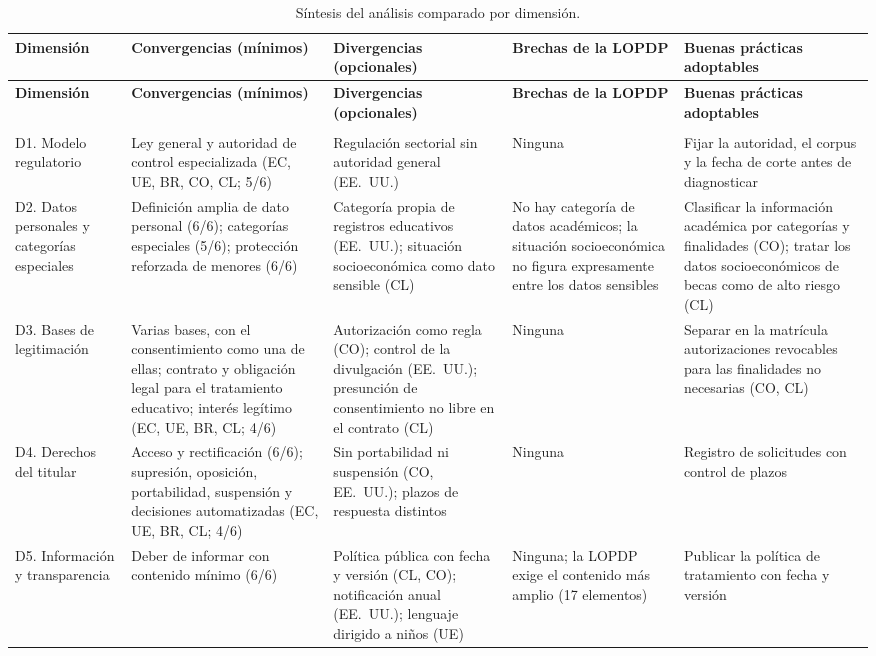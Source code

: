 {\scriptsize
\renewcommand{\arraystretch}{1.15}
\begin{xltabular}{\textwidth}{|>{\raggedright\arraybackslash}p{2.6cm}|L|L|L|L|}
  \caption{Síntesis del análisis comparado por dimensión.}
  \label{tab:sintesis_dimensiones} \\
  \hline
  \textbf{Dimensión} & \textbf{Convergencias (mínimos)} & \textbf{Divergencias (opcionales)} & \textbf{Brechas de la LOPDP} & \textbf{Buenas prácticas adoptables} \\
  \hline
  \endfirsthead
  \hline
  \textbf{Dimensión} & \textbf{Convergencias (mínimos)} & \textbf{Divergencias (opcionales)} & \textbf{Brechas de la LOPDP} & \textbf{Buenas prácticas adoptables} \\
  \hline
  \endhead
  \hline
   \\
  \endfoot
  \hline
  \endlastfoot
  D1. Modelo regulatorio & Ley general y autoridad de control especializada (EC, UE, BR, CO, CL; 5/6) & Regulación sectorial sin autoridad general (EE.~UU.) & Ninguna & Fijar la autoridad, el corpus y la fecha de corte antes de diagnosticar \\ \hline
  D2. Datos personales y categorías especiales & Definición amplia de dato personal (6/6); categorías especiales (5/6); protección reforzada de menores (6/6) & Categoría propia de registros educativos (EE.~UU.); situación socioeconómica como dato sensible (CL) & No hay categoría de datos académicos; la situación socioeconómica no figura expresamente entre los datos sensibles & Clasificar la información académica por categorías y finalidades (CO); tratar los datos socioeconómicos de becas como de alto riesgo (CL) \\ \hline
  D3. Bases de legitimación & Varias bases, con el consentimiento como una de ellas; contrato y obligación legal para el tratamiento educativo; interés legítimo (EC, UE, BR, CL; 4/6) & Autorización como regla (CO); control de la divulgación (EE.~UU.); presunción de consentimiento no libre en el contrato (CL) & Ninguna & Separar en la matrícula autorizaciones revocables para las finalidades no necesarias (CO, CL) \\ \hline
  D4. Derechos del titular & Acceso y rectificación (6/6); supresión, oposición, portabilidad, suspensión y decisiones automatizadas (EC, UE, BR, CL; 4/6) & Sin portabilidad ni suspensión (CO, EE.~UU.); plazos de respuesta distintos & Ninguna & Registro de solicitudes con control de plazos \\ \hline
  D5. Información y transparencia & Deber de informar con contenido mínimo (6/6) & Política pública con fecha y versión (CL, CO); notificación anual (EE.~UU.); lenguaje dirigido a niños (UE) & Ninguna; la LOPDP exige el contenido más amplio (17 elementos) & Publicar la política de tratamiento con fecha y versión \\ \hline

\end{xltabular}}
